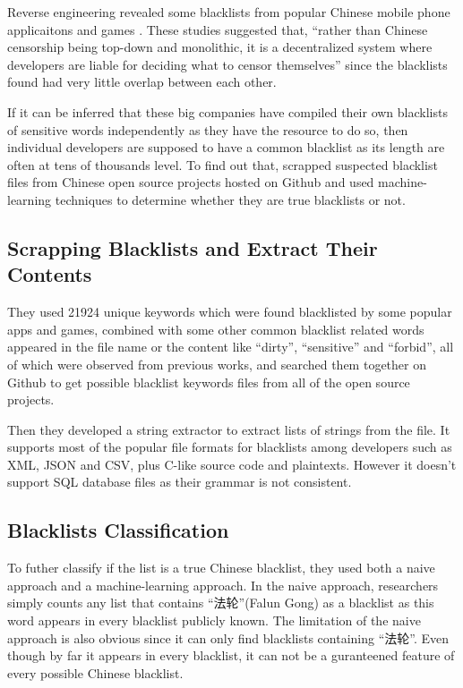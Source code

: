 \documentclass[11pt]{article} %
\begin{document}
Reverse engineering revealed some blacklists from popular Chinese mobile phone applicaitons \cite{knockel2011three} \cite{knockel2015every} and games \cite{knockel2017measuring}. These studies suggested that, ``rather than Chinese censorship being top-down and monolithic, it is a decentralized system where developers are liable for deciding what to censor themselves'' \cite{knockel2018effect} since the blacklists found had very little overlap between each other.

If it can be inferred that these big companies have compiled their own blacklists of sensitive words independently as they have the resource to do so, then individual developers are supposed to have a common blacklist as its length are often at tens of thousands level. To find out that, \cite{knockel2018effect} scrapped suspected blacklist files from Chinese open source projects hosted on Github and used machine-learning techniques to determine whether they are true blacklists or not.

\subsection{Scrapping Blacklists and Extract Their Contents}

They used 21924 unique keywords which were found blacklisted by some popular apps and games, combined with some other common blacklist related words appeared in the file name or the content like ``dirty'', ``sensitive'' and ``forbid'', all of which were observed from previous works, and searched them together on Github to get possible blacklist keywords files from all of the open source projects.

Then they developed a string extractor to extract lists of strings from the file. It supports most of the popular file formats for blacklists among developers such as XML, JSON and CSV, plus C-like source code and plaintexts. However it doesn't support SQL database files as their grammar is not consistent.

\subsection{Blacklists Classification}

To futher classify if the list is a true Chinese blacklist, they used both a naive approach and a machine-learning approach. In the naive approach, researchers simply counts any list that contains ``法轮''(Falun Gong) as a blacklist as this word appears in every blacklist publicly known. The limitation of the naive approach is also obvious since it can only find blacklists containing ``法轮''. Even though by far it appears in every blacklist, it can not be a guranteened feature of every possible Chinese blacklist.
\end{document}
